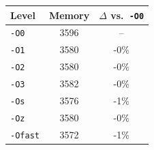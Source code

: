 \begin{tabular*}{\columnwidth}{@{\extracolsep\fill}lcc@{\extracolsep\fill}}
\toprule
\textbf{Level} & \textbf{Memory} & \textbf{$\Delta$ vs.\ \texttt{-O0}} \\
\midrule
\texttt{-O0} & 3596 & -- \\
\texttt{-O1} & 3580 & -0\% \\
\texttt{-O2} & 3580 & -0\% \\
\texttt{-O3} & 3582 & -0\% \\
\texttt{-Os} & 3576 & -1\% \\
\texttt{-Oz} & 3580 & -0\% \\
\texttt{-Ofast} & 3572 & -1\% \\
\bottomrule
\end{tabular*}
